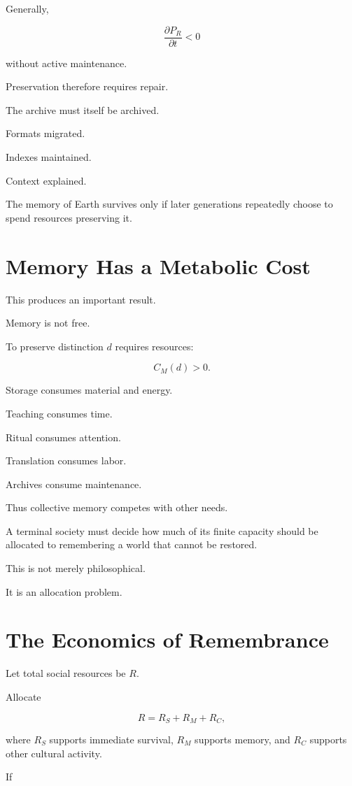 \documentclass[11pt,oneside]{book}
\theoremstyle{definition}
\theoremstyle{remark}
\begin{document}
Generally,

\[
\frac{\partial P_R}{\partial t}<0
\]

without active maintenance.

Preservation therefore requires repair.

The archive must itself be archived.

Formats migrated.

Indexes maintained.

Context explained.

The memory of Earth survives only if later generations repeatedly choose to spend resources preserving it.

\section{Memory Has a Metabolic Cost}

This produces an important result.

Memory is not free.

To preserve distinction \(d\) requires resources:

\[
C_M(d)>0.
\]

Storage consumes material and energy.

Teaching consumes time.

Ritual consumes attention.

Translation consumes labor.

Archives consume maintenance.

Thus collective memory competes with other needs.

A terminal society must decide how much of its finite capacity should be allocated to remembering a world that cannot be restored.

This is not merely philosophical.

It is an allocation problem.

\section{The Economics of Remembrance}

Let total social resources be \(R\).

Allocate

\[
R
=
R_S+R_M+R_C,
\]

where \(R_S\) supports immediate survival, \(R_M\) supports memory, and \(R_C\) supports other cultural activity.

If
\end{document}

